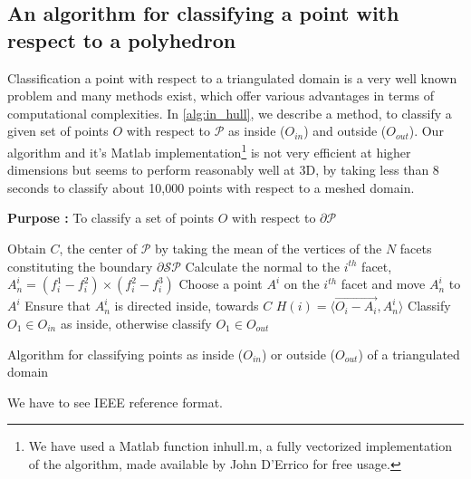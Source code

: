 \documentclass[12pt,a4]{article}
\begin{document}
\subsection{An algorithm for classifying a point with respect to a polyhedron}\label{app:polyhedron_point}
\indent Classification a point with respect to a triangulated domain is a very well known problem and many methods exist, which offer various advantages in terms of computational complexities. In \cref{alg:in_hull}, we describe a method, to classify a given set of points $O$ with respect to $\mathcal{P}$ as inside ($O_{in}$) and outside ($O_{out}$). Our algorithm and it's Matlab implementation\footnote{We have used a Matlab function inhull.m, a fully vectorized implementation of the algorithm, made available by John D'Errico for free usage. } is not very efficient at higher dimensions but seems to perform reasonably well at 3D, by taking less than 8 seconds to classify about 10,000 points with respect to a meshed domain. 
\begin{algorithm}[ht!]
	\textbf{Purpose :} To classify a set of points $ O $ with respect to $\partial \mathcal{P}$\\
	\begin{algorithmic}[1]
		\STATE Obtain $C$, the center of $\mathcal{P}$ by taking the mean of the vertices of the $N$ facets constituting the boundary $\partial \mathcal{SP}$
		\STATE Calculate the normal to the $i^{th}$ facet, $A_n^i=(f_i^1-f_i^2)\times(f_i^2-f_i^3)$
		\STATE Choose a point $A^i$ on the $i^{th}$ facet and move $A_n^i$ to $A^i$
		\STATE Ensure that $A_n^i$ is directed inside, towards $C$
		\STATE $H(i)=\langle\vec{O_i-A_i}, A_n^i\rangle$
		\ENDFOR 
		\STATE Classify $O_1 \in O_{in}$ as inside, otherwise classify $O_1\in O_{out}$  		
		\ENDIF
	\end{algorithmic}
	
	\caption{Algorithm for classifying points as inside ($O_{in}$) or outside ($O_{out}$) of a triangulated domain}		
	\label{alg:in_hull}
\end{algorithm}

%


\begin{thebibliography}{99}

We have to see IEEE reference format.
%
%


\end{thebibliography}
\end{document}

